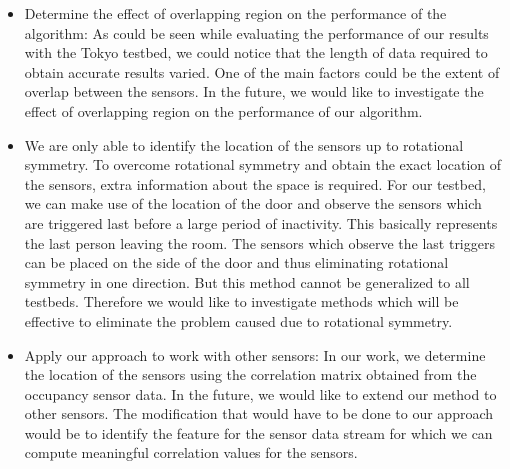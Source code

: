 \begin{itemize}
\item Determine the effect of overlapping region on the performance of the algorithm: As could be seen while evaluating the performance of our results with the Tokyo testbed, we could notice that the length of data required to obtain accurate results varied. One of the main factors could be the extent of overlap between the sensors. In the future, we would like to investigate the effect of overlapping region on the performance of our algorithm.
\item We are only able to identify the location of the sensors up to rotational symmetry. To overcome rotational symmetry and obtain the exact location of the sensors, extra information about the space is required. For our testbed, we can make use of the location of the door and observe the sensors which are triggered last before a large period of inactivity. This basically represents the last person leaving the room. The sensors which observe the last triggers can be placed on the side of the door and thus eliminating rotational symmetry in one direction. But this method cannot be generalized to all testbeds. Therefore we would like to investigate methods which will be effective to eliminate the problem caused due to rotational symmetry.
\item Apply our approach to work with other sensors: In our work, we determine the location of the sensors using the correlation matrix obtained from the occupancy sensor data.
In the future, we would like to extend our method to other sensors. The modification that would have to be done to our approach would be to identify the feature for the sensor data stream for which we can compute meaningful correlation values for the sensors.

\end{itemize}